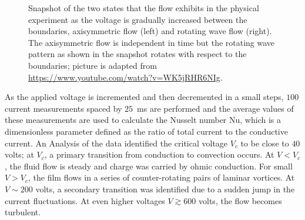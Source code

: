 \begin{figure}[th]
\begin{center}
\caption{Snapshot of the two states that the flow exhibits in the physical experiment as the voltage is gradually increased between the boundaries, axisymmetric flow (left) and rotating wave flow (right). The axisymmetric flow is independent in time but the rotating wave pattern as shown in the snapshot rotates with respect to the boundaries; picture is adapted from \url{https://www.youtube.com/watch?v=WK5jRHR6NIg}. }\label{fig_exp_snap}
\end{center}
\end{figure}

As the applied voltage is incremented and then decremented in a small steps, $100$ current measurements spaced by $25$\ ms are performed and the average values of these measurements are used to calculate the Nusselt number $\mathrm{Nu}$, which is a dimensionless parameter defined as the ratio of total current to the conductive current. An Analysis of the data identified the critical voltage $V_c$ to be close to $40$ volts; at $V_c$, a primary transition from conduction to convection occurs. At $V < V_c$, the fluid flow is steady and charge was carried by ohmic conduction. For small $V>V_c$, the film flows in a series of counter-rotating pairs of laminar vortices. At $V\sim 200$ volts, a secondary transition was identified due to a sudden jump in the current fluctuations. At even higher voltages $V \gtrsim 600$ volts, the flow becomes turbulent.

